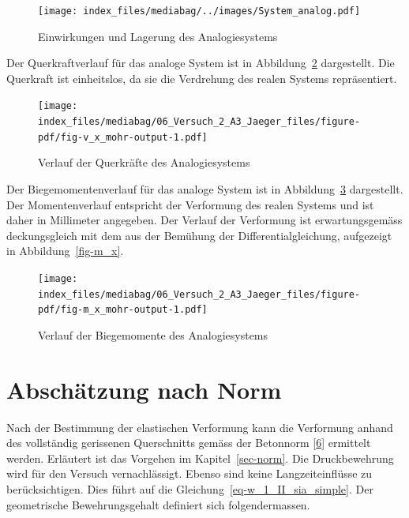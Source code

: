 \documentclass[
  12pt,
  letterpaper,
  egregdoesnotlikesansseriftitles]{scrreprt}
\begin{document}
\begin{figure}[H]

{\centering \texttt{[image: index\_files/mediabag/../images/System\_analog.pdf]}

}

\caption{\label{fig-system_analog}Einwirkungen und Lagerung des
Analogiesystems}

\end{figure}

Der Querkraftverlauf für das analoge System ist in
Abbildung~\ref{fig-v_x_mohr} dargestellt. Die Querkraft ist einheitslos,
da sie die Verdrehung des realen Systems repräsentiert.

\begin{figure}[H]

{\centering \texttt{[image: index\_files/mediabag/06\_Versuch\_2\_A3\_Jaeger\_files/figure-pdf/fig-v\_x\_mohr-output-1.pdf]}

}

\caption{\label{fig-v_x_mohr}Verlauf der Querkräfte des Analogiesystems}

\end{figure}

Der Biegemomentenverlauf für das analoge System ist in
Abbildung~\ref{fig-m_x_mohr} dargestellt. Der Momentenverlauf entspricht
der Verformung des realen Systems und ist daher in Millimeter angegeben.
Der Verlauf der Verformung ist erwartungsgemäss deckungsgleich mit dem
aus der Bemühung der Differentialgleichung, aufgezeigt in
Abbildung~\ref{fig-m_x}.

\begin{figure}[H]

{\centering \texttt{[image: index\_files/mediabag/06\_Versuch\_2\_A3\_Jaeger\_files/figure-pdf/fig-m\_x\_mohr-output-1.pdf]}

}

\caption{\label{fig-m_x_mohr}Verlauf der Biegemomente des
Analogiesystems}

\end{figure}

\hypertarget{abschuxe4tzung-nach-norm}{%
\section{Abschätzung nach Norm}\label{abschuxe4tzung-nach-norm}}

Nach der Bestimmung der elastischen Verformung kann die Verformung
anhand des vollständig gerissenen Querschnitts gemäss der Betonnorm
{[}\protect\hyperlink{ref-SIA2013a}{6}{]} ermittelt werden. Erläutert
ist das Vorgehen im Kapitel~\ref{sec-norm}. Die Druckbewehrung wird für
den Versuch vernachlässigt. Ebenso sind keine Langzeiteinflüsse zu
berücksichtigen. Dies führt auf die
Gleichung~\ref{eq-w_1_II_sia_simple}. Der geometrische Bewehrungsgehalt
definiert sich folgendermassen.
\end{document}
